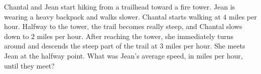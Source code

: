 Chantal and Jean start hiking from a trailhead toward a fire tower. Jean is wearing a heavy backpack and walks slower. Chantal starts walking at $4$ miles per hour. Halfway to the tower, the trail becomes really steep, and Chantal slows down to $2$ miles per hour. After reaching the tower, she immediately turns around and descends the steep part of the trail at $3$ miles per hour. She meets Jean at the halfway point. What was Jean's average speed, in miles per hour, until they meet?
